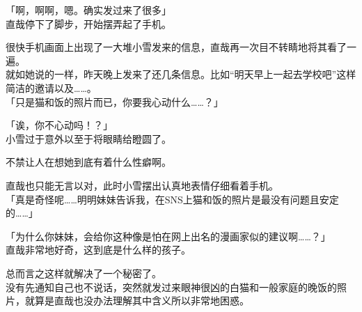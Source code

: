 「啊，啊啊，嗯。确实发过来了很多」\\

直哉停下了脚步，开始摆弄起了手机。

很快手机画面上出现了一大堆小雪发来的信息，直哉再一次目不转睛地将其看了一遍。\\

就如她说的一样，昨天晚上发来了还几条信息。比如“明天早上一起去学校吧”这样简洁的邀请以及……。\\

「只是猫和饭的照片而已，你要我心动什么……？」

「诶，你不心动吗！？」\\

小雪过于意外以至于将眼睛给瞪圆了。

不禁让人在想她到底有着什么性癖啊。

直哉也只能无言以对，此时小雪摆出认真地表情仔细看着手机。\\

「真是奇怪呢……明明妹妹告诉我，在SNS上猫和饭的照片是最没有问题且安定的……」

「为什么你妹妹，会给你这种像是怕在网上出名的漫画家似的建议啊……？」\\

直哉非常地好奇，这到底是什么样的孩子。

总而言之这样就解决了一个秘密了。\\

没有先通知自己也不说话，突然就发过来眼神很凶的白猫和一般家庭的晚饭的照片，就算是直哉也没办法理解其中含义所以非常地困惑。

